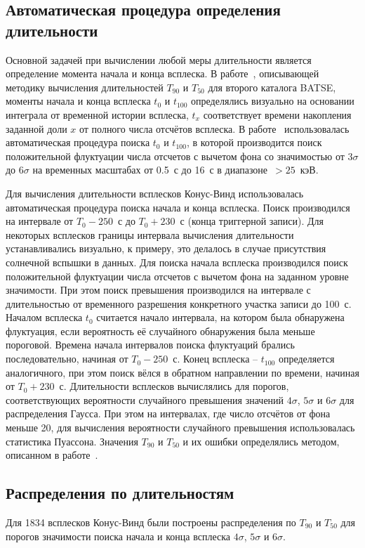 \subsection{Автоматическая процедура определения длительности}
Основной задачей при вычислении любой меры длительности является определение момента 
начала и конца всплеска. В работе~\citep{Koshut_1996}, описывающей методику вычисления 
длительностей $T_{90}$ и $T_{50}$  для второго каталога BATSE, моменты начала и 
конца всплеска $t_{0}$ и $t_{100}$ определялись визуально на основании интеграла 
от временной истории всплеска, $t_{x}$ соответствует времени накопления заданной 
доли $x$ от полного числа отсчётов всплеска. В работе~\citep{Bonnell_1997} использовалась 
автоматическая процедура поиска $t_{0}$ и $t_{100}$, в которой производится поиск 
положительной флуктуации числа отсчетов с вычетом фона со значимостью от $3\sigma$ 
до $6\sigma$ на временных масштабах от 0.5~с до 16~с в диапазоне~$>25$~кэВ. 

Для вычисления длительности всплесков Конус-Винд использовалась автоматическая 
процедура поиска начала и конца всплеска. Поиск производился на интервале от 
$T_0-250$~с до $T_0+230$~с (конца триггерной записи). Для некоторых всплесков 
границы интервала вычисления длительности устанавливались визуально, к примеру, 
это делалось в случае присутствия солнечной вспышки в данных. Для поиска начала 
всплеска производился поиск положительной флуктуации числа отсчетов с вычетом 
фона на заданном уровне значимости. При этом поиск превышения производился на 
интервале с длительностью от временного разрешения конкретного участка записи до 100~с. 
Началом всплеска $t_0$ считается начало интервала, на котором была обнаружена флуктуация, 
если вероятность её случайного обнаружения была меньше пороговой. Времена начала 
интервалов поиска флуктуаций брались последовательно, начиная от $T_0-250$~с. 
Конец всплеска -- $t_{100}$ определяется аналогичного, при этом поиск вёлся в 
обратном направлении по времени, начиная от $T_0 + 230$~с. Длительности всплесков 
вычислялись для порогов, соответствующих вероятности случайного превышения 
значений $4\sigma$, $5\sigma$ и $6\sigma$ для распределения Гаусса. При этом на 
интервалах, где число отсчётов от фона меньше 20, для вычисления вероятности 
случайного превышения использовалась статистика Пуассона. Значения $T_{90}$ и $T_{50}$ 
и их ошибки определялись методом, описанном в работе~\citep{Koshut_1996}. 

\subsection{Распределения по длительностям}
Для 1834 всплесков Конус-Винд были построены распределения по $T_{90}$ и $T_{50}$ 
для порогов значимости поиска начала и конца всплеска $4\sigma$, $5\sigma$ и $6\sigma$. 

